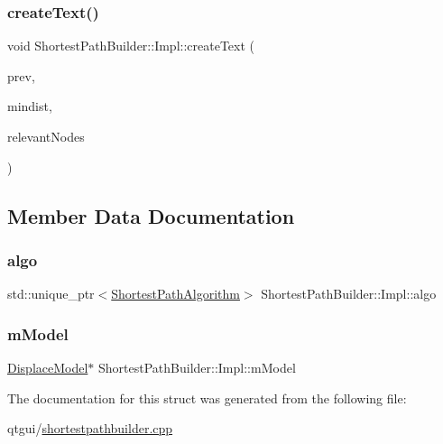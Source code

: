 \subsubsection{\texorpdfstring{createText()}{createText()}}
{\footnotesize\ttfamily void Shortest\+Path\+Builder\+::\+Impl\+::create\+Text (\begin{DoxyParamCaption}\item[{Q\+String}]{prev,  }\item[{Q\+String}]{mindist,  }\item[{const Q\+List$<$ std\+::shared\+\_\+ptr$<$ \mbox{\hyperlink{class_node_data}{Node\+Data}} $>$ $>$ \&}]{relevant\+Nodes }\end{DoxyParamCaption})\hspace{0.3cm}{\ttfamily [inline]}}



\subsection{Member Data Documentation}
\mbox{\label{struct_shortest_path_builder_1_1_impl_a5bd31625c55e559d0dd32ad888fd6097}} 
\subsubsection{\texorpdfstring{algo}{algo}}
{\footnotesize\ttfamily std\+::unique\+\_\+ptr$<$\mbox{\hyperlink{class_shortest_path_algorithm}{Shortest\+Path\+Algorithm}}$>$ Shortest\+Path\+Builder\+::\+Impl\+::algo}

\mbox{\label{struct_shortest_path_builder_1_1_impl_a49fd32cfa2e1acbac7e504752ccf04d7}} 
\subsubsection{\texorpdfstring{mModel}{mModel}}
{\footnotesize\ttfamily \mbox{\hyperlink{class_displace_model}{Displace\+Model}}$\ast$ Shortest\+Path\+Builder\+::\+Impl\+::m\+Model}



The documentation for this struct was generated from the following file\+:\begin{DoxyCompactItemize}
\item 
qtgui/\mbox{\hyperlink{shortestpathbuilder_8cpp}{shortestpathbuilder.\+cpp}}\end{DoxyCompactItemize}
